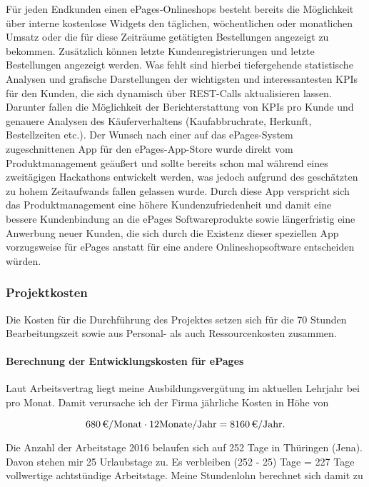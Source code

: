 Für jeden Endkunden einen ePages-Onlineshops besteht bereits die Möglichkeit über interne kostenlose Widgets den täglichen, wöchentlichen oder monatlichen Umsatz oder die für diese Zeiträume getätigten Bestellungen angezeigt zu bekommen. Zusätzlich können letzte Kundenregistrierungen und letzte Bestellungen angezeigt werden.
Was fehlt sind hierbei tiefergehende statistische Analysen und grafische Darstellungen der wichtigsten und interessantesten KPIs für den Kunden, die sich dynamisch über REST-Calls aktualisieren lassen. Darunter fallen die Möglichkeit der Berichterstattung von KPIs pro Kunde und genauere Analysen des Käuferverhaltens (Kaufabbruchrate, Herkunft, Bestellzeiten etc.). Der Wunsch nach einer auf das ePages-System zugeschnittenen App für den ePages-App-Store wurde direkt vom Produktmanagement geäußert und sollte bereits schon mal während eines zweitägigen Hackathons entwickelt werden, was jedoch aufgrund des geschätzten zu hohem Zeitaufwands fallen gelassen wurde. Durch diese App verspricht sich das Produktmanagement eine höhere Kundenzufriedenheit und damit eine bessere Kundenbindung an die ePages Softwareprodukte sowie längerfristig eine Anwerbung neuer Kunden, die sich durch die Existenz dieser speziellen App vorzugsweise für ePages anstatt für eine andere Onlineshopsoftware entscheiden würden.
\subsubsection{Projektkosten}
\label{sec:Projektkosten}

Die Kosten für die Durchführung des Projektes setzen sich für die 70 Stunden Bearbeitungszeit sowie aus Personal- als auch Ressourcenkosten zusammen.

\paragraph{Berechnung der Entwicklungskosten für ePages}
Laut Arbeitsvertrag liegt meine Ausbildungsvergütung im aktuellen Lehrjahr bei  pro Monat. Damit verursache ich der Firma jährliche Kosten in Höhe von 

\begin{equation}
	\eur{680}/\mbox{Monat} \cdot 12 \mbox{Monate/Jahr} = \eur{8160}/\mbox{Jahr}.
\end{equation}

Die Anzahl der Arbeitstage 2016 belaufen sich auf 252 Tage in Thüringen (Jena). Davon stehen mir 25 Urlaubstage zu. Es verbleiben (252 - 25) Tage = 227 Tage vollwertige  achtstündige Arbeitstage. Meine Stundenlohn berechnet sich damit zu


